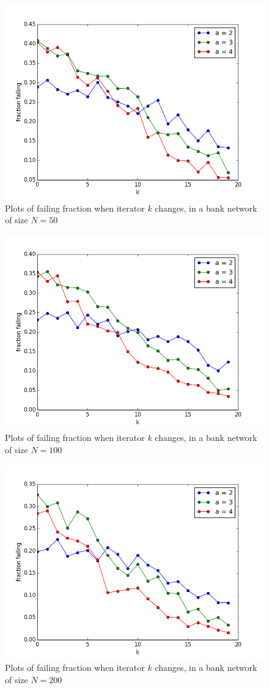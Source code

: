 \documentclass[a4paper, 11pt]{article}
\begin{document}
\begin{figure}[htbp]
    \centering
	\includegraphics[width=.8\textwidth]{images/ff50.png}
	\caption{Plots of failing fraction when iterator $k$ changes, in a bank network of size $N=50$}\label{fig:exp1}
\end{figure}
\begin{figure}[htbp]
    \centering
	\includegraphics[width=.8\textwidth]{images/ff100.png}
	\caption{Plots of failing fraction when iterator $k$ changes, in a bank network of size $N=100$}\label{fig:exp2}
\end{figure}
\begin{figure}[htbp]
    \centering
	\includegraphics[width=.8\textwidth]{images/ff200.png}
	\caption{Plots of failing fraction when iterator $k$ changes, in a bank network of size $N=200$}\label{fig:exp3}
\end{figure}
\end{document}
